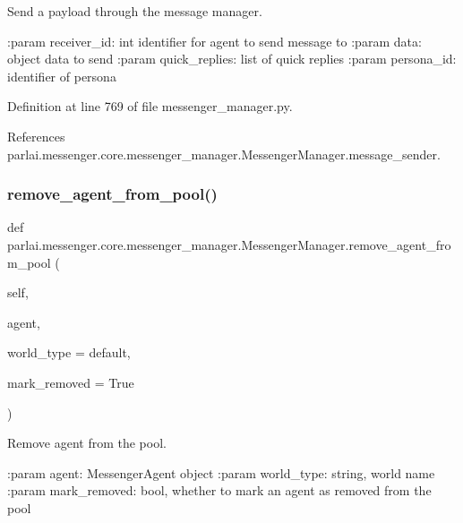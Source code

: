 \begin{DoxyVerb}Send a payload through the message manager.

:param receiver_id:
    int identifier for agent to send message to
:param data:
    object data to send
:param quick_replies:
    list of quick replies
:param persona_id:
    identifier of persona
\end{DoxyVerb}
 

Definition at line 769 of file messenger\+\_\+manager.\+py.



References parlai.\+messenger.\+core.\+messenger\+\_\+manager.\+Messenger\+Manager.\+message\+\_\+sender.

\mbox{\label{classparlai_1_1messenger_1_1core_1_1messenger__manager_1_1MessengerManager_a39c02eecd48359b564bddc86897cae4c}} 
\subsubsection{\texorpdfstring{remove\+\_\+agent\+\_\+from\+\_\+pool()}{remove\_agent\_from\_pool()}}
{\footnotesize\ttfamily def parlai.\+messenger.\+core.\+messenger\+\_\+manager.\+Messenger\+Manager.\+remove\+\_\+agent\+\_\+from\+\_\+pool (\begin{DoxyParamCaption}\item[{}]{self,  }\item[{}]{agent,  }\item[{}]{world\+\_\+type = {\ttfamily \textquotesingle{}default\textquotesingle{}},  }\item[{}]{mark\+\_\+removed = {\ttfamily True} }\end{DoxyParamCaption})}

\begin{DoxyVerb}Remove agent from the pool.

:param agent:
    MessengerAgent object
:param world_type:
    string, world name
:param mark_removed:
    bool, whether to mark an agent as removed from the pool
\end{DoxyVerb}
 

